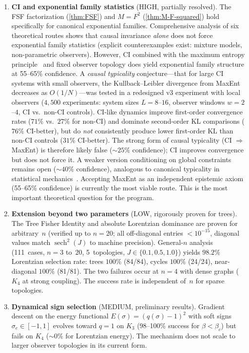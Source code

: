 \documentclass[11pt]{article}
\theoremstyle{definition}
\theoremstyle{remark}
\begin{document}
\begin{enumerate}
\item \textbf{CI and exponential family statistics} (HIGH, partially
  resolved).
  The FSF factorization (\cref{thm:FSF}) and $M = F^2$
  (\cref{thm:M-F-squared}) hold specifically for canonical exponential
  families.
  Comprehensive analysis of six theoretical routes shows that causal
  invariance \emph{alone} does not force exponential family statistics
  (explicit counterexamples exist: mixture models, non-parametric
  observers).
  However, CI combined with the maximum entropy
  principle~\cite{Jaynes1957}
  and fixed observer topology does yield exponential family structure
  at 55--65\% confidence.
  A \emph{causal typicality} conjecture---that for large CI systems
  with small observers, the Kullback--Leibler divergence from MaxEnt
  decreases as $O(1/N)$---was tested in a redesigned v3 experiment
  with local observers ($4{,}500$ experiments: system sizes $L = 8$--$16$,
  observer windows $w = 2$--$4$, CI vs.\ non-CI controls).
  CI-like dynamics improve first-order convergence rates ($71\%$ vs.\ $27\%$
  for non-CI) and dominate second-order KL comparisons ($76\%$
  CI-better), but do \emph{not} consistently produce lower first-order
  KL than non-CI controls ($31\%$ CI-better).
  The strong form of causal typicality (CI $\Rightarrow$ MaxEnt)
  is therefore likely false ($\sim 25\%$ confidence);
  CI improves convergence but does not force it.
  A weaker version conditioning on global
  constraints remains open ($\sim 40\%$ confidence), analogous to
  canonical typicality in statistical
  mechanics~\cite{PopescuShortWinter2006}.
  Accepting MaxEnt as an independent epistemic axiom (55--65\%
  confidence) is currently the most viable route.
  This is the most important theoretical question for the program.

\item \textbf{Extension beyond two parameters} (LOW, rigorously proven for
  trees).
  The Tree Fisher Identity and absolute Lorentzian dominance are proven
  for arbitrary~$n$ (verified up to $n = 20$; all off-diagonal entries
  $< 10^{-15}$, diagonal values match $\operatorname{sech}^2(J)$ to
  machine precision).
  General-$n$ analysis (111~cases, $n = 3$ to~$20$, 5~topologies,
  $J \in \{0.1, 0.5, 1.0\}$) yields $98.2\%$ Lorentzian selection rate:
  trees $100\%$ (84/84), cycles $100\%$ (24/24),
  near-diagonal $100\%$ (81/81).
  The two failures occur at $n = 4$ with dense graphs ($K_4$ at
  strong coupling).
  The success rate is independent of~$n$ for sparse topologies.

\item \textbf{Dynamical sign selection} (MEDIUM, preliminary results).
  Gradient descent on the energy functional
  $E(\sigma) = (q(\sigma) - 1)^2$ with soft signs $\sigma_e \in [-1,1]$
  evolves toward $q = 1$ on $K_3$ (98--100\% success for $\beta < \beta_c$)
  but fails on $K_4$ ($\sim\!0$\% for Lorentzian energy).
  The mechanism does not scale to larger observer topologies in its
  current form.


\end{enumerate}
\end{document}
